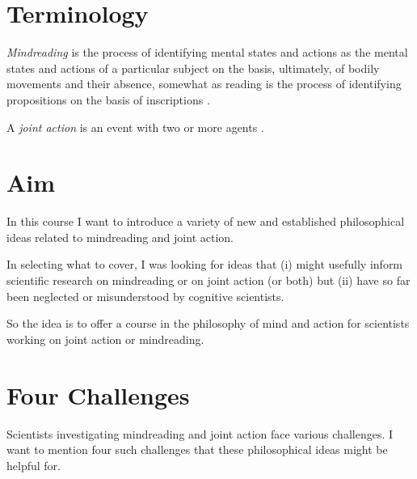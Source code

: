 \documentclass[12pt,\papersize]{extarticle}
\begin{document}
\setlength\footnotesep{1em}




\maketitle
%
%
%



\section{Terminology}


\textit{Mindreading} is 
	the process of 
	identifying mental states and actions 
	as the mental states and actions of a particular subject 
	on the basis, ultimately, of bodily movements and their absence,
somewhat as reading is the process of identifying propositions on the basis of inscriptions \citep[p.\ 4]{Apperly:2010kx}.


A \textit{joint action} is an event with two or more agents \citep{ludwig_collective_2007}.


\section{Aim}
In this course I want to introduce a variety of new and established philosophical ideas related to mindreading and joint action.

In selecting what to cover, I was looking for ideas that (i) might usefully inform scientific research on mindreading or on joint action (or both) but (ii) have so far been neglected or misunderstood by cognitive scientists.

So the idea is to offer a  course in the philosophy of mind and action for scientists working on joint action or mindreading.


\section{Four Challenges}
Scientists investigating mindreading and joint action face various challenges.
I want to mention four such challenges that these philosophical ideas might be helpful for.
\end{document}
